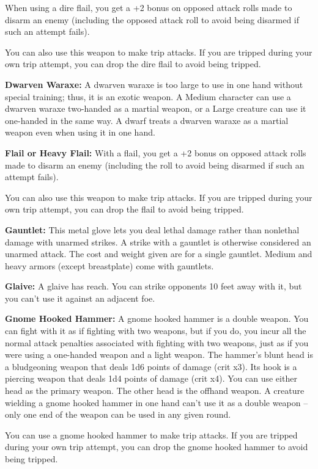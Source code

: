 When using a dire flail, you get a +2 bonus on opposed attack rolls made to disarm 
an enemy (including the opposed attack roll to avoid being disarmed if such an 
attempt fails).

You can also use this weapon to make trip attacks. If you are tripped during your 
own trip attempt, you can drop the dire flail to avoid being tripped.

\textbf{Dwarven Waraxe:} A dwarven waraxe is too large to use in one hand without 
special training; thus, it is an exotic weapon. A Medium character can use a dwarven 
waraxe two-handed as a martial weapon, or a Large creature can use it one-handed 
in the same way. A dwarf treats a dwarven waraxe as a martial weapon even when 
using it in one hand.

\textbf{Flail or Heavy Flail:} With a flail, you get a +2 bonus on opposed attack 
rolls made to disarm an enemy (including the roll to avoid being disarmed if such 
an attempt fails).

You can also use this weapon to make trip attacks. If you are tripped during your 
own trip attempt, you can drop the flail to avoid being tripped.

\textbf{Gauntlet:} This metal glove lets you deal lethal damage rather than nonlethal 
damage with unarmed strikes. A strike with a gauntlet is otherwise considered an 
unarmed attack. The cost and weight given are for a single gauntlet. Medium and 
heavy armors (except breastplate) come with gauntlets.

\textbf{Glaive:} A glaive has reach. You can strike opponents 10 feet away with 
it, but you can't use it against an adjacent foe.

\textbf{Gnome Hooked Hammer:} A gnome hooked hammer is a double weapon. You can 
fight with it as if fighting with two weapons, but if you do, you incur all the 
normal attack penalties associated with fighting with two weapons, just as if you 
were using a one-handed weapon and a light weapon. The hammer's blunt head is a 
bludgeoning weapon that deals 1d6 points of damage (crit x3). Its hook is a piercing 
weapon that deals 1d4 points of damage (crit x4). You can use either head as the 
primary weapon. The other head is the offhand weapon. A creature wielding a gnome 
hooked hammer in one hand can't use it as a double weapon -- only one end of the 
weapon can be used in any given round.

You can use a gnome hooked hammer to make trip attacks. If you are tripped during 
your own trip attempt, you can drop the gnome hooked hammer to avoid being tripped.

